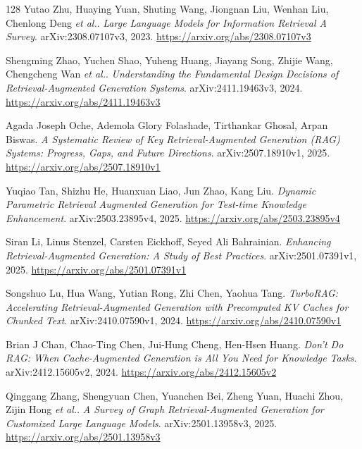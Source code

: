 \documentclass[11pt,a4paper]{article}
\begin{document}
\begin{thebibliography}{128}
Yutao Zhu, Huaying Yuan, Shuting Wang, Jiongnan Liu, Wenhan Liu, Chenlong Deng \emph{et al.}.
\newblock \emph{Large Language Models for Information Retrieval A Survey}.
\newblock arXiv:2308.07107v3, 2023.
\newblock \url{https://arxiv.org/abs/2308.07107v3}

Shengming Zhao, Yuchen Shao, Yuheng Huang, Jiayang Song, Zhijie Wang, Chengcheng Wan \emph{et al.}.
\newblock \emph{Understanding the Fundamental Design Decisions of Retrieval-Augmented Generation Systems}.
\newblock arXiv:2411.19463v3, 2024.
\newblock \url{https://arxiv.org/abs/2411.19463v3}

Agada Joseph Oche, Ademola Glory Folashade, Tirthankar Ghosal, Arpan Biswas.
\newblock \emph{A Systematic Review of Key Retrieval-Augmented Generation (RAG) Systems: Progress, Gaps, and Future Directions}.
\newblock arXiv:2507.18910v1, 2025.
\newblock \url{https://arxiv.org/abs/2507.18910v1}

Yuqiao Tan, Shizhu He, Huanxuan Liao, Jun Zhao, Kang Liu.
\newblock \emph{Dynamic Parametric Retrieval Augmented Generation for Test-time Knowledge Enhancement}.
\newblock arXiv:2503.23895v4, 2025.
\newblock \url{https://arxiv.org/abs/2503.23895v4}

Siran Li, Linus Stenzel, Carsten Eickhoff, Seyed Ali Bahrainian.
\newblock \emph{Enhancing Retrieval-Augmented Generation: A Study of Best Practices}.
\newblock arXiv:2501.07391v1, 2025.
\newblock \url{https://arxiv.org/abs/2501.07391v1}

Songshuo Lu, Hua Wang, Yutian Rong, Zhi Chen, Yaohua Tang.
\newblock \emph{TurboRAG: Accelerating Retrieval-Augmented Generation with Precomputed KV Caches for Chunked Text}.
\newblock arXiv:2410.07590v1, 2024.
\newblock \url{https://arxiv.org/abs/2410.07590v1}

Brian J Chan, Chao-Ting Chen, Jui-Hung Cheng, Hen-Hsen Huang.
\newblock \emph{Don't Do RAG: When Cache-Augmented Generation is All You Need for Knowledge Tasks}.
\newblock arXiv:2412.15605v2, 2024.
\newblock \url{https://arxiv.org/abs/2412.15605v2}

Qinggang Zhang, Shengyuan Chen, Yuanchen Bei, Zheng Yuan, Huachi Zhou, Zijin Hong \emph{et al.}.
\newblock \emph{A Survey of Graph Retrieval-Augmented Generation for Customized Large Language Models}.
\newblock arXiv:2501.13958v3, 2025.
\newblock \url{https://arxiv.org/abs/2501.13958v3}


\end{thebibliography}
\end{document}

